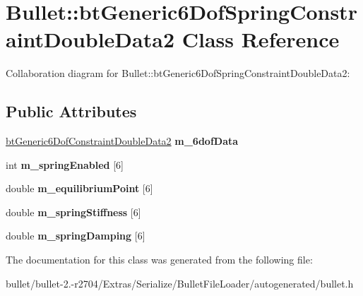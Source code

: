 \hypertarget{class_bullet_1_1bt_generic6_dof_spring_constraint_double_data2}{\section{Bullet\+:\+:bt\+Generic6\+Dof\+Spring\+Constraint\+Double\+Data2 Class Reference}
\label{class_bullet_1_1bt_generic6_dof_spring_constraint_double_data2}
}


Collaboration diagram for Bullet\+:\+:bt\+Generic6\+Dof\+Spring\+Constraint\+Double\+Data2\+:
\subsection*{Public Attributes}
\begin{DoxyCompactItemize}
\item 
\hypertarget{class_bullet_1_1bt_generic6_dof_spring_constraint_double_data2_a45615a1dcf603f82ae9e3600b0ed2eda}{\hyperlink{class_bullet_1_1bt_generic6_dof_constraint_double_data2}{bt\+Generic6\+Dof\+Constraint\+Double\+Data2} {\bfseries m\+\_\+6dof\+Data}}\label{class_bullet_1_1bt_generic6_dof_spring_constraint_double_data2_a45615a1dcf603f82ae9e3600b0ed2eda}

\item 
\hypertarget{class_bullet_1_1bt_generic6_dof_spring_constraint_double_data2_a5879975c96e893bdd61aedf58f7c51ba}{int {\bfseries m\+\_\+spring\+Enabled} \mbox{[}6\mbox{]}}\label{class_bullet_1_1bt_generic6_dof_spring_constraint_double_data2_a5879975c96e893bdd61aedf58f7c51ba}

\item 
\hypertarget{class_bullet_1_1bt_generic6_dof_spring_constraint_double_data2_a0997195fc068bc40af3f5307d6a4fc30}{double {\bfseries m\+\_\+equilibrium\+Point} \mbox{[}6\mbox{]}}\label{class_bullet_1_1bt_generic6_dof_spring_constraint_double_data2_a0997195fc068bc40af3f5307d6a4fc30}

\item 
\hypertarget{class_bullet_1_1bt_generic6_dof_spring_constraint_double_data2_a481b8b549acdafa69275b7f2bfb6d330}{double {\bfseries m\+\_\+spring\+Stiffness} \mbox{[}6\mbox{]}}\label{class_bullet_1_1bt_generic6_dof_spring_constraint_double_data2_a481b8b549acdafa69275b7f2bfb6d330}

\item 
\hypertarget{class_bullet_1_1bt_generic6_dof_spring_constraint_double_data2_a6b91f0de722ff702f4514a8a9a69ce95}{double {\bfseries m\+\_\+spring\+Damping} \mbox{[}6\mbox{]}}\label{class_bullet_1_1bt_generic6_dof_spring_constraint_double_data2_a6b91f0de722ff702f4514a8a9a69ce95}

\end{DoxyCompactItemize}


The documentation for this class was generated from the following file\+:\begin{DoxyCompactItemize}
\item 
bullet/bullet-\/2.-\/r2704/\+Extras/\+Serialize/\+Bullet\+File\+Loader/autogenerated/bullet.\+h\end{DoxyCompactItemize}
